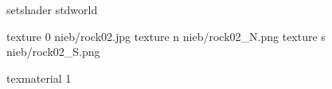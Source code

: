setshader stdworld

texture 0 nieb/rock02.jpg
texture n nieb/rock02_N.png
texture s nieb/rock02_S.png

texmaterial 1
